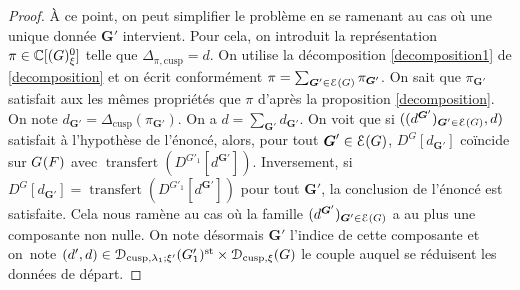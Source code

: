 \documentclass[11pt]{article}
\numberwithin{equation}{section}\providecommand{\og}{«\,}\providecommand{\fg}{\,»}
\let\mathcal \EuScript
\newcommand{\NoChangel}[1]{%
\expandafter\let\csname old\string#1\endcsname=#1
\let#1=\relax
\newcommand{#1}{\mathcode`l="716C\csname old\string#1\endcsname\mathcode`l="7160 }%
}
\newcommand{\cusp}{\mathrm{cusp}}
\newcommand{\rell}{\mathrm{ell}} \NoChangel{\rell}
\newcommand{\Ell}{\mathrm{Ell}} \NoChangel{\Ell}
\newcommand{\st}{\mathrm{st}}
\DeclareMathOperator{\transfert}{transfert}
\newcommand{\bG}{\boldsymbol{G}}
\newcommand{\cD}{\mathcal{D}}
\newcommand{\cE}{\mathcal{E}}
\newcommand{\CC}{\mathbb{C}}
\theoremstyle{plain}
\theoremstyle{definition}
\begin{document}
\begin{proof}
À ce point, on peut simplifier le problème en se ramenant au cas où une unique donnée $\bG'$ intervient. Pour cela, on introduit la représentation $\pi\in \CC[\Ell(G)_{\xi}^0]$ telle que $\Delta_{\pi,\cusp}=d$. On utilise la décomposition \eqref{decomposition1} de \ref{decomposition} et on écrit conformément $\pi=\sum_{\bG'\in \cE(G)}\pi_{\bG'}$. On sait que $\pi_{\bG'}$ satisfait aux les mêmes propriétés que $\pi$ d'après la proposition \ref{decomposition}. On note $d_{\bG'}=\Delta_{\cusp}(\pi_{\bG'})$. On a $d=\sum_{\bG'}d_{\bG'}$. On voit que si $((d^{\bG'})_{\bG'\in \cE(G)},d)$ satisfait à l'hypothèse de l'énoncé, alors, pour tout $\bG'\in \cE(G)$, $D^G[d_{\bG'}]$ coïncide sur $G_{\rell}(F)$ avec $\transfert(D^{G'_{1}}[d^{\bG'}])$. Inversement, si $D^G[d_{\bG'}]=\transfert(D^{G'_{1}}[d^{\bG'}])$ pour tout $\bG'$, la conclusion de l'énoncé est satisfaite. Cela nous ramène au cas où la famille $(d^{\bG'})_{\bG'\in \cE(G)}$ a au plus une composante non nulle. On note désormais $\bG'$ l'indice de cette composante et on~note $(d',d)\in \cD_{\cusp,\lambda_{1};\xi'}(G'_{1})^{\st}\times \cD_{\cusp,\xi}(G)$ le couple auquel se réduisent les données de départ.


\end{proof}
\end{document}
